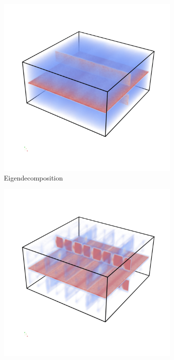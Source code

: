 \begin{figure}
    \begin{subfigure}[b]{0.49\textwidth}
        \includegraphics[width=\textwidth]{Images/shiftXeigen.png}
        \caption{Eigendecomposition}
        \label{fig:shiftXeigen}
    \end{subfigure}
    \begin{subfigure}[b]{0.49\textwidth}
        \includegraphics[width=\textwidth]{Images/shiftXcholesky.png}

\end{subfigure}
\end{figure}
